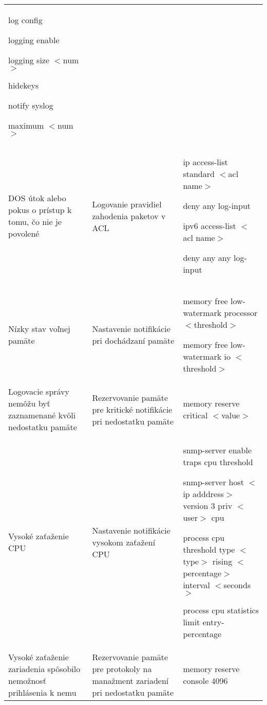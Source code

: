 \begin{longtable}[!htbp]{|L{10em}L{10em}>{\selectfont}L{34em}|}
	log config
	
	logging enable
	
	logging size $<$num$>$
	
	
	hidekeys
	
	notify syslog
	
	maximum $<$num$>$\\
	
	
	
	
	 DOS útok alebo pokus o prístup k tomu, čo nie je povolené	&Logovanie pravidiel zahodenia paketov v ACL	&ip access-list standard $<$acl name$>$
	
	\hspace{0.5em}deny any log-input
	
	ipv6 access-list $<$acl name$>$
	
	\hspace{0.5em}deny any any log-input\\
	
	
	
	
	Nízky stav voľnej pamäte	&Nastavenie notifikácie pri dochádzaní pamäte	&memory free low-watermark processor $<$threshold$>$
	
	memory free low-watermark io $<$threshold$>$\\
	
	
	
	
	Logovacie správy nemôžu byť zaznamenané kvôli nedostatku pamäte	&Rezervovanie pamäte pre kritické notifikácie pri nedostatku pamäte	&memory reserve critical $<$value$>$ \\
	
	
	
	
	Vysoké zaťaženie CPU	&Nastavenie notifikácie vysokom zaťažení CPU	&snmp-server enable traps cpu threshold
	
	snmp-server host $<$ip adddress$>$ version 3 priv $<$user$>$ cpu
	
	process cpu threshold type $<$type$>$ rising $<$percentage$>$ interval $<$seconds$>$
	
	process cpu statistics limit entry-percentage\\
	
	
	
	 Vysoké zaťaženie zariadenia spôsobilo nemožnosť prihlásenia k nemu	&Rezervovanie pamäte pre protokoly na manažment zariadení pri nedostatku pamäte	&memory reserve console 4096\\
	
	
	

\end{longtable}
